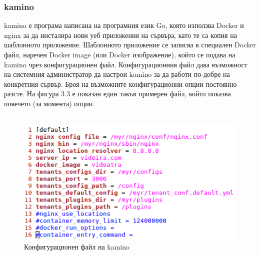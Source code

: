 \documentclass[pdftex,14pt,a4paper]{extreport}
\begin{document}
\subsubsection {kamino}
kamino е програма написана на програмния език Go, която използва Docker и nginx за да инсталира нови уеб приложения на сървъра, като те са копия на шаблонното приложение. Шаблонното приложение се записва в специален Docker файл, наречен Docker image (или Docker изображение), който се подава на kamino чрез конфигурационен файл. Конфигурационния файл дава възможност на системния администратор да настрои kamino за да работи по-добре на конкретния сървър. Броя на възможните конфигурационни опции постоянно разсте. На фигура 3.3 е показан един такъв примерен файл, който показва повечето (за момента) опции. \\\\
\begin{figure}[H]
  \centering
  \includegraphics[scale=0.8]{./snippets/config}
  \caption{Конфигурационен файл на kamino}
\end{figure}
\end{document}
